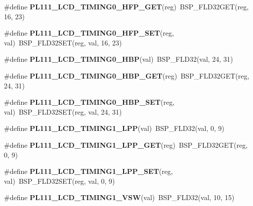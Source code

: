 \begin{DoxyCompactItemize}
\#define {\bfseries P\+L111\+\_\+\+L\+C\+D\+\_\+\+T\+I\+M\+I\+N\+G0\+\_\+\+H\+F\+P\+\_\+\+G\+ET}(reg)~B\+S\+P\+\_\+\+F\+L\+D32\+G\+ET(reg, 16, 23)
\item 
\mbox{\label{arm-pl111-regs_8h_af37dffca3e840ac7595adb15a7094afc}} 
\#define {\bfseries P\+L111\+\_\+\+L\+C\+D\+\_\+\+T\+I\+M\+I\+N\+G0\+\_\+\+H\+F\+P\+\_\+\+S\+ET}(reg,  val)~B\+S\+P\+\_\+\+F\+L\+D32\+S\+ET(reg, val, 16, 23)
\item 
\mbox{\label{arm-pl111-regs_8h_ac6caad383992f10c00fb396d606bda6b}} 
\#define {\bfseries P\+L111\+\_\+\+L\+C\+D\+\_\+\+T\+I\+M\+I\+N\+G0\+\_\+\+H\+BP}(val)~B\+S\+P\+\_\+\+F\+L\+D32(val, 24, 31)
\item 
\mbox{\label{arm-pl111-regs_8h_a946deea14cdb56de42864c55a895279c}} 
\#define {\bfseries P\+L111\+\_\+\+L\+C\+D\+\_\+\+T\+I\+M\+I\+N\+G0\+\_\+\+H\+B\+P\+\_\+\+G\+ET}(reg)~B\+S\+P\+\_\+\+F\+L\+D32\+G\+ET(reg, 24, 31)
\item 
\mbox{\label{arm-pl111-regs_8h_a1423111ee14a2a5ac082b511741ffdb8}} 
\#define {\bfseries P\+L111\+\_\+\+L\+C\+D\+\_\+\+T\+I\+M\+I\+N\+G0\+\_\+\+H\+B\+P\+\_\+\+S\+ET}(reg,  val)~B\+S\+P\+\_\+\+F\+L\+D32\+S\+ET(reg, val, 24, 31)
\item 
\mbox{\label{arm-pl111-regs_8h_a2afecce820fcc54e7b8d09e9ae1ca884}} 
\#define {\bfseries P\+L111\+\_\+\+L\+C\+D\+\_\+\+T\+I\+M\+I\+N\+G1\+\_\+\+L\+PP}(val)~B\+S\+P\+\_\+\+F\+L\+D32(val, 0, 9)
\item 
\mbox{\label{arm-pl111-regs_8h_a29d3ea9ab4d27d3afec8bcd3a8473a9f}} 
\#define {\bfseries P\+L111\+\_\+\+L\+C\+D\+\_\+\+T\+I\+M\+I\+N\+G1\+\_\+\+L\+P\+P\+\_\+\+G\+ET}(reg)~B\+S\+P\+\_\+\+F\+L\+D32\+G\+ET(reg, 0, 9)
\item 
\mbox{\label{arm-pl111-regs_8h_aac238d42c2ca38e7e7b4ce4f69fb647d}} 
\#define {\bfseries P\+L111\+\_\+\+L\+C\+D\+\_\+\+T\+I\+M\+I\+N\+G1\+\_\+\+L\+P\+P\+\_\+\+S\+ET}(reg,  val)~B\+S\+P\+\_\+\+F\+L\+D32\+S\+ET(reg, val, 0, 9)
\item 
\mbox{\label{arm-pl111-regs_8h_ab1524fa644eeb5110e4166d4cf83cfb2}} 
\#define {\bfseries P\+L111\+\_\+\+L\+C\+D\+\_\+\+T\+I\+M\+I\+N\+G1\+\_\+\+V\+SW}(val)~B\+S\+P\+\_\+\+F\+L\+D32(val, 10, 15)

\end{DoxyCompactItemize}
